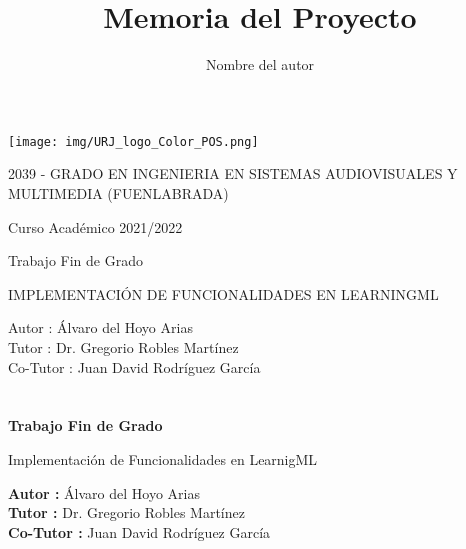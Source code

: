 \documentclass[a4paper, 12pt]{book}
\title{Memoria del Proyecto}
\author{Nombre del autor}
\begin{document}
\renewcommand{\refname}{Bibliografía}  %
\renewcommand{\appendixname}{Apéndice}


\begin{titlepage}
\begin{center}
\texttt{[image: img/URJ\_logo\_Color\_POS.png]}

\vspace{1.75cm}

\Large
2039 - GRADO EN INGENIERIA EN SISTEMAS AUDIOVISUALES Y MULTIMEDIA (FUENLABRADA)

\vspace{0.4cm}

\large
Curso Académico 2021/2022

\vspace{0.8cm}

Trabajo Fin de Grado

\vspace{2.5cm}

\LARGE
IMPLEMENTACIÓN DE FUNCIONALIDADES EN LEARNINGML

\vspace{4cm}

\large
Autor : Álvaro del Hoyo Arias \\
Tutor : Dr. Gregorio Robles Martínez \\
Co-Tutor : Juan David Rodríguez García
\end{center}
\end{titlepage}

\newpage
\mbox{}
\thispagestyle{empty} %


\clearpage
{}
\chapter*{}

\vspace{-4cm}
\begin{center}
\LARGE
\textbf{Trabajo Fin de Grado}

\vspace{1cm}
\large
Implementación de Funcionalidades en LearnigML

\vspace{1cm}
\large
\textbf{Autor :} Álvaro del Hoyo Arias \\
\textbf{Tutor :} Dr. Gregorio Robles Martínez \\
\textbf{Co-Tutor :} Juan David Rodríguez García

\end{center}
\end{document}
